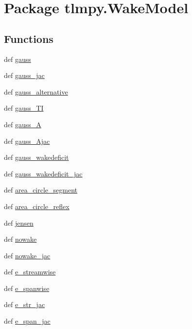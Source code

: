 \hypertarget{namespacetlmpy_1_1WakeModel}{
\section{Package tlmpy.WakeModel}
\label{namespacetlmpy_1_1WakeModel}
}
\subsection*{Functions}
\begin{DoxyCompactItemize}
\item 
def \hyperlink{namespacetlmpy_1_1WakeModel_a26319d0555ae055b533052cdae00c551}{gauss}
\item 
def \hyperlink{namespacetlmpy_1_1WakeModel_a77013f552afb8bb8df4ed6a2faf76f47}{gauss\_\-jac}
\item 
def \hyperlink{namespacetlmpy_1_1WakeModel_aca85906fb572f3126366fc36d0540ba5}{gauss\_\-alternative}
\item 
def \hyperlink{namespacetlmpy_1_1WakeModel_a886be027dedbbc967ee8b8ffb7290ed4}{gauss\_\-TI}
\item 
def \hyperlink{namespacetlmpy_1_1WakeModel_a0e0f3fa2bc51f34fb52d4ccdd5938c1f}{gauss\_\-A}
\item 
def \hyperlink{namespacetlmpy_1_1WakeModel_a5bbdfca77ef1eaf8f780a053296a15b9}{gauss\_\-Ajac}
\item 
def \hyperlink{namespacetlmpy_1_1WakeModel_a8fe24afad7328d8f4ce1ae5ee548678e}{gauss\_\-wakedeficit}
\item 
def \hyperlink{namespacetlmpy_1_1WakeModel_a47b74567181b38c2148ad48928b1fc2f}{gauss\_\-wakedeficit\_\-jac}
\item 
def \hyperlink{namespacetlmpy_1_1WakeModel_a8167fb8ed0bf948b133eecc36b8c3d19}{area\_\-circle\_\-segment}
\item 
def \hyperlink{namespacetlmpy_1_1WakeModel_ad9569b5fb894fc9640e4916b1ae8216c}{area\_\-circle\_\-reflex}
\item 
def \hyperlink{namespacetlmpy_1_1WakeModel_ad5cb03923dca50b88770a990920dc2d8}{jensen}
\item 
def \hyperlink{namespacetlmpy_1_1WakeModel_a323f039020d6a9dd30d1bc0be305ae1b}{nowake}
\item 
def \hyperlink{namespacetlmpy_1_1WakeModel_a12a39c518292a3d7208a8003b42660f0}{nowake\_\-jac}
\item 
def \hyperlink{namespacetlmpy_1_1WakeModel_ae02c0817db7ccd19ab4a5e63c5c76afd}{e\_\-streamwise}
\item 
def \hyperlink{namespacetlmpy_1_1WakeModel_ae49cae5052af57950bdf818df30d1515}{e\_\-spanwise}
\item 
def \hyperlink{namespacetlmpy_1_1WakeModel_a571992343123619b79d2879a4bcde946}{e\_\-str\_\-jac}
\item 
def \hyperlink{namespacetlmpy_1_1WakeModel_a868387cb653848d640fa99ff825132b9}{e\_\-span\_\-jac}
\end{DoxyCompactItemize}
